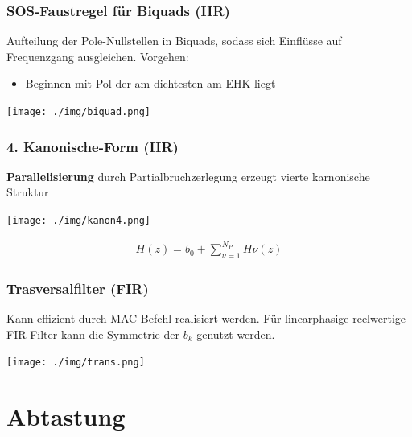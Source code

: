 \documentclass[10pt,a4paper]{article}
\begin{document}
  \subsubsection{SOS-Faustregel für Biquads (IIR)}
  Aufteilung der Pole-Nullstellen in Biquads, sodass sich Einflüsse auf Frequenzgang ausgleichen.
  Vorgehen:
  \begin{itemize}
      \item Beginnen mit Pol der am dichtesten am EHK liegt
  \end{itemize}
    \begin{center}
        \texttt{[image: ./img/biquad.png]}
    \end{center}
\begin{minipage}{0.5\textwidth}   
\subsubsection{4. Kanonische-Form (IIR)}
\textbf{Parallelisierung} durch Partialbruchzerlegung erzeugt vierte karnonische Struktur\\
  \begin{center}
      \texttt{[image: ./img/kanon4.png]}
  \end{center}
  \begin{mdframed}[style=exercise]
    \begin{align}
        H(z)=b_0+\sum_{\nu=1}^{N_P}H\nu(z)
    \end{align}
  \end{mdframed}
\end{minipage}
\subsubsection{Trasversalfilter (FIR)}
Kann effizient durch MAC-Befehl realisiert werden. 
Für linearphasige reelwertige FIR-Filter kann die Symmetrie der $b_k$ genutzt werden.
  \begin{center}
      \texttt{[image: ./img/trans.png]}
  \end{center}
\section{Abtastung}
\end{document}
